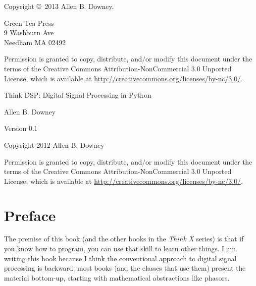 \documentclass[12pt]{book}
\newcommand{\thetitle}{Think DSP: Digital Signal Processing in Python}
\newcommand{\theversion}{0.1}
\begin{document}
\begin{latexonly}
Copyright \copyright ~2013 Allen B. Downey.


\vspace{0.2in}

\begin{flushleft}
Green Tea Press       \\
9 Washburn Ave \\
Needham MA 02492
\end{flushleft}

Permission is granted to copy, distribute, and/or modify this document
under the terms of the Creative Commons Attribution-NonCommercial 3.0 Unported
License, which is available at \url{http://creativecommons.org/licenses/by-nc/3.0/}.

\vspace{0.2in}

\end{latexonly}



\begin{htmlonly}


{\Large \thetitle}

{\large Allen B. Downey}

Version \theversion

\vspace{0.25in}

Copyright 2012 Allen B. Downey

\vspace{0.25in}

Permission is granted to copy, distribute, and/or modify this document
under the terms of the Creative Commons Attribution-NonCommercial 3.0
Unported License, which is available at
\url{http://creativecommons.org/licenses/by-nc/3.0/}.

\setcounter{chapter}{-1}

\end{htmlonly}

\fi

\chapter{Preface}
\label{preface}

The premise of this book (and the other books in the {\it Think X}
series) is that if you know how to program, you can use that skill to
learn other things.  I am writing this book because I think the
conventional approach to digital signal processing is backward: most
books (and the classes that use them) present the material bottom-up,
starting with mathematical abstractions like phasors.
\end{document}
